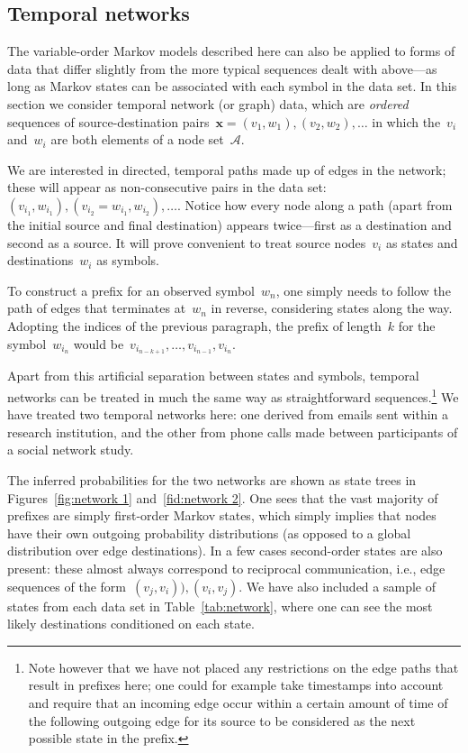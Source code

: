 \documentclass[12pt,a4paper]{article}
\newcommand\mc[1]{\mathcal{#1}}               %
\newcommand\ub[1]{\symbf{#1}}                 %
\begin{document}
\subsection{Temporal networks}\label{sec:temporal networks} %

The variable-order Markov models described here can also be applied to forms of
data that differ slightly from the more typical sequences dealt with above---as
long as Markov states can be associated with each symbol in the data set. In
this section we consider temporal network (or graph) data, which are
\emph{ordered} sequences of source-destination pairs~\(\ub{x} = (v_1, w_1),
(v_2, w_2), \dots\) in which the~\(v_i\) and~\(w_i\) are both elements of a node
set~\(\mc{A}\).

We are interested in directed, temporal paths made up of edges in the network;
these will appear as non-consecutive pairs in the data set:~\((v_{i_1},
w_{i_1}), (v_{i_2} = w_{i_1}, w_{i_2}), \dots\). Notice how every node along a
path (apart from the initial source and final destination) appears twice---first
as a destination and second as a source. It will prove convenient to treat
source nodes~\(v_i\) as states and destinations~\(w_i\) as symbols.

To construct a prefix for an observed symbol~\(w_n\), one simply needs to follow
the path of edges that terminates at~\(w_n\) in reverse, considering states
along the way. Adopting the indices of the previous paragraph, the prefix of
length~\(k\) for the symbol~\(w_{i_n}\) would be~\(v_{i_{n-k+1}}, \dots,
v_{i_{n-1}}, v_{i_n}\).

Apart from this artificial separation between states and symbols, temporal
networks can be treated in much the same way as straightforward
sequences.\footnote{Note however that we have not placed any restrictions on the
edge paths that result in prefixes here; one could for example take timestamps
into account and require that an incoming edge occur within a certain amount of
time of the following outgoing edge for its source to be considered as the next
possible state in the prefix.} We have treated two temporal networks here: one
derived from emails sent within a research institution, and the other from phone
calls made between participants of a social network study.

The inferred probabilities for the two networks are shown as state trees in
Figures~\ref{fig:network 1} and~\ref{fid:network 2}. One sees that the vast
majority of prefixes are simply first-order Markov states, which simply implies
that nodes have their own outgoing probability distributions (as opposed to a
global distribution over edge destinations). In a few cases second-order states
are also present: these almost always correspond to reciprocal communication,
i.e., edge sequences of the form~\((v_j, v_i)), (v_i, v_j)\). We have also
included a sample of states from each data set in Table~\ref{tab:network}, where
one can see the most likely destinations conditioned on each state.
\end{document}
